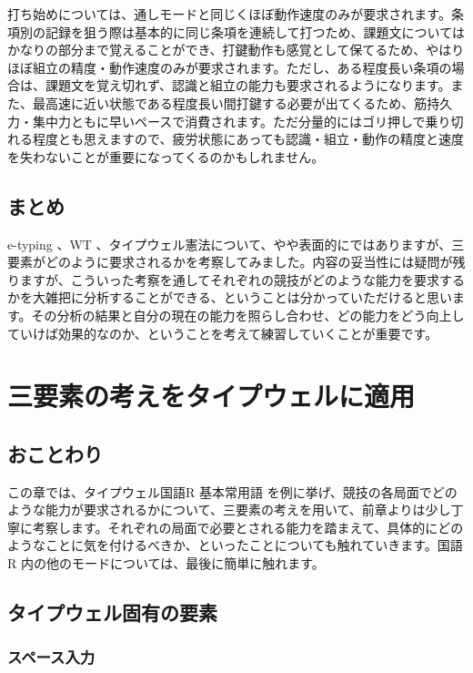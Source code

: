打ち始めについては、通しモードと同じくほぼ動作速度のみが要求されます。条項別の記録を狙う際は基本的に同じ条項を連続して打つため、課題文についてはかなりの部分まで覚えることができ、打鍵動作も感覚として保てるため、やはりほぼ組立の精度・動作速度のみが要求されます。ただし、ある程度長い条項の場合は、課題文を覚え切れず、認識と組立の能力も要求されるようになります。また、最高速に近い状態である程度長い間打鍵する必要が出てくるため、筋持久力・集中力ともに早いペースで消費されます。ただ分量的にはゴリ押しで乗り切れる程度とも思えますので、疲労状態にあっても認識・組立・動作の精度と速度を失わないことが重要になってくるのかもしれません。

\subsection{まとめ}

e-typing 、WT 、タイプウェル憲法について、やや表面的にではありますが、三要素がどのように要求されるかを考察してみました。内容の妥当性には疑問が残りますが、こういった考察を通してそれぞれの競技がどのような能力を要求するかを大雑把に分析することができる、ということは分かっていただけると思います。その分析の結果と自分の現在の能力を照らし合わせ、どの能力をどう向上していけば効果的なのか、ということを考えて練習していくことが重要です。

\section{三要素の考えをタイプウェルに適用}

\subsection{おことわり}

この章では、タイプウェル国語R 基本常用語 を例に挙げ、競技の各局面でどのような能力が要求されるかについて、三要素の考えを用いて、前章よりは少し丁寧に考察します。それぞれの局面で必要とされる能力を踏まえて、具体的にどのようなことに気を付けるべきか、といったことについても触れていきます。国語R 内の他のモードについては、最後に簡単に触れます。

\subsection{タイプウェル固有の要素}

\subsubsection*{スペース入力}

